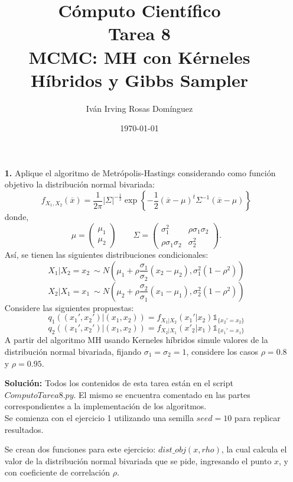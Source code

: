 \documentclass[letterpaper]{article}
\title{\textbf{Cómputo Científico\\
Tarea 8\\
MCMC: MH con Kérneles Híbridos y Gibbs Sampler}}
\author{Iván Irving Rosas Domínguez}
\date{\today}
\newcommand{\1}{\mathds{1}}
\theoremstyle{definition}
\theoremstyle{definition}
\theoremstyle{definition}
\theoremstyle{definition}
\theoremstyle{definition}
\begin{document}
\maketitle


\begin{itemize}
    \item[\textbf{1.}] Aplique el algoritmo de Metrópolis-Hastings considerando como función 
    objetivo la distribución normal bivariada:
    \[
    f_{X_1,X_2}(\overline{x})=\frac{1}{2\pi}|\Sigma|^{-\frac{1}{2}}\exp \left\{-\frac{1}{2}(\overline{x}-\mu)^{t}\Sigma^{-1}(\overline{x}-\mu)\right\}    
    \]
    donde,
    \[
    \mu=\begin{pmatrix}
        \mu_1\\
        \mu_2
    \end{pmatrix}
    \qquad
    \Sigma=
    \begin{pmatrix}
        \sigma_1^2 & \rho\sigma_1\sigma_2\\
        \rho\sigma_1\sigma_2 & \sigma_2^2
    \end{pmatrix}.    
    \]
    Así, se tienen las siguientes distribuciones condicionales:
    \[
    X_1|X_2=x_2 \ \sim N\left(\mu_1+\rho\frac{\sigma_1}{\sigma_2}(x_2-\mu_2),\sigma_1^2(1-\rho^2)\right)
    \]
    \[
    X_2|X_1=x_1 \ \sim N\left(\mu_2+\rho\frac{\sigma_2}{\sigma_1}(x_1-\mu_1),\sigma_2^2(1-\rho^2)\right)    
    \]
    Considere las siguientes propuestas:
    \[
    q_1((x_1',x_2')|(x_1,x_2))=f_{X_1|X_2}(x_1'|x_2)\1_{\{x_2'=x_2\}}    
    \]
    \[
    q_2((x_1',x_2')|(x_1,x_2))=f_{X_2|X_1}(x'_2|x_1)\1_{\{x_1'=x_1\}}    
    \]
    A partir del algoritmo MH usando Kerneles híbridos simule valores de la distribución 
    normal bivariada, fijando $\sigma_1=\sigma_2=1$, considere los casos $\rho=0.8$ y $\rho=0.95$.
    \newline

    \textbf{Solución:} Todos los contenidos de esta tarea están en el script $Computo Tarea 8.py$.
    El mismo se encuentra comentado en las partes correspondientes a la implementación de los 
    algoritmos.\\

    Se comienza con el ejercicio 1 utilizando una semilla $seed=10$ para replicar resultados.
    \newline

    Se crean dos funciones para este ejercicio: $dist\_obj(x,rho)$, la cual calcula el 
    valor de la distribución normal bivariada que se pide, ingresando el punto $x$, y 
    con coeficiente de correlación $\rho$. 
    \newline


\end{itemize}
\end{document}
